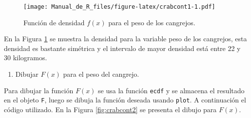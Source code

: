 \documentclass[10pt,]{krantz}
\makeatletter
\newenvironment{Shaded}{\begin{snugshade}}{\end{snugshade}}
\newcommand{\KeywordTok}[1]{\textcolor[rgb]{0.13,0.29,0.53}{\textbf{#1}}}
\newcommand{\DataTypeTok}[1]{\textcolor[rgb]{0.13,0.29,0.53}{#1}}
\newcommand{\DecValTok}[1]{\textcolor[rgb]{0.00,0.00,0.81}{#1}}
\newcommand{\FloatTok}[1]{\textcolor[rgb]{0.00,0.00,0.81}{#1}}
\newcommand{\StringTok}[1]{\textcolor[rgb]{0.31,0.60,0.02}{#1}}
\newcommand{\OperatorTok}[1]{\textcolor[rgb]{0.81,0.36,0.00}{\textbf{#1}}}
\newcommand{\NormalTok}[1]{#1}
\providecommand{\tightlist}{%
  \setlength{\itemsep}{0pt}\setlength{\parskip}{0pt}}
\newenvironment{kframe}{%
\medskip{}
\setlength{\fboxsep}{.8em}
 \def\at@end@of@kframe{}%
 \ifinner\ifhmode%
  \def\at@end@of@kframe{\end{minipage}}%
  \begin{minipage}{\columnwidth}%
 \fi\fi%
 \def\FrameCommand##1{\hskip\@totalleftmargin \hskip-\fboxsep
 \colorbox{shadecolor}{##1}\hskip-\fboxsep
     \hskip-\linewidth \hskip-\@totalleftmargin \hskip\columnwidth}%
 \MakeFramed {\advance\hsize-\width
   \@totalleftmargin\z@ \linewidth\hsize
   \@setminipage}}%
 {\par\unskip\endMakeFramed%
 \at@end@of@kframe}
\renewenvironment{Shaded}{\begin{kframe}}{\end{kframe}}
\makeatother
\begin{document}
\begin{Shaded}
\end{Shaded}

\begin{figure}
\centering
\texttt{[image: Manual\_de\_R\_files/figure-latex/crabcont1-1.pdf]}
\caption{\label{fig:crabcont1}Función de densidad \(f(x)\) para el peso de
los cangrejos.}
\end{figure}

En la Figura \ref{fig:crabcont1} se muestra la densidad para la variable
peso de los cangrejos, esta densidad es bastante simétrica y el
intervalo de mayor densidad está entre 22 y 30 kilogramos.

\begin{enumerate}
\def\labelenumi{\arabic{enumi})}
\setcounter{enumi}{1}
\tightlist
\item
  Dibujar \(F(x)\) para el peso del cangrejo.
\end{enumerate}

Para dibujar la función \(F(x)\) se usa la función \texttt{ecdf} y se
almacena el resultado en el objeto \texttt{F}, luego se dibuja la
función deseada usando \texttt{plot}. A continuación el código
utilizado. En la Figura \ref{fig:crabcont2} se presenta el dibujo para
\(F(x)\).

\begin{Shaded}
\end{Shaded}
\end{document}

